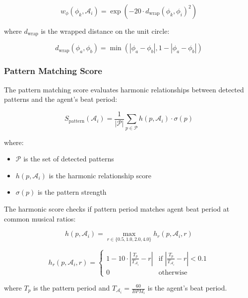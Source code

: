 \documentclass[11pt,a4paper]{article}
\begin{document}
\begin{equation}
w_{\phi}(\phi_k, \mathcal{A}_i) = \exp\left(-20 \cdot d_{\text{wrap}}(\phi_k, \phi_i)^2\right)
\end{equation}

\noindent where $d_{\text{wrap}}$ is the wrapped distance on the unit circle:

\begin{equation}
d_{\text{wrap}}(\phi_a, \phi_b) = \min(|\phi_a - \phi_b|, 1 - |\phi_a - \phi_b|)
\end{equation}

\subsubsection{Pattern Matching Score}

The pattern matching score evaluates harmonic relationships between detected patterns and the agent's beat period:

\begin{equation}
S_{\text{pattern}}(\mathcal{A}_i) = \frac{1}{|\mathcal{P}|} \sum_{p \in \mathcal{P}} h(p, \mathcal{A}_i) \cdot \sigma(p)
\end{equation}

\noindent where:
\begin{itemize}
\item $\mathcal{P}$ is the set of detected patterns
\item $h(p, \mathcal{A}_i)$ is the harmonic relationship score
\item $\sigma(p)$ is the pattern strength
\end{itemize}

The harmonic score checks if pattern period matches agent beat period at common musical ratios:

\begin{equation}
h(p, \mathcal{A}_i) = \max_{r \in \{0.5, 1.0, 2.0, 4.0\}} h_r(p, \mathcal{A}_i, r)
\end{equation}

\begin{equation}
h_r(p, \mathcal{A}_i, r) = \begin{cases}
1 - 10 \cdot \left|\frac{T_p}{T_{\mathcal{A}_i}} - r\right| & \text{if } \left|\frac{T_p}{T_{\mathcal{A}_i}} - r\right| < 0.1 \\
0 & \text{otherwise}
\end{cases}
\end{equation}

\noindent where $T_p$ is the pattern period and $T_{\mathcal{A}_i} = \frac{60}{BPM_i}$ is the agent's beat period.
\end{document}

